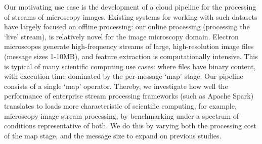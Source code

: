 \documentclass[conference]{IEEEtran}
\begin{document}


Our motivating use case 
is the development of a cloud pipeline for the processing of streams of microscopy images. Existing systems for working with such datasets have largely focused on offline processing: our online processing (processing the `live' stream), 
is relatively novel for the image microscopy domain. %
Electron microscopes generate high-frequency streams of large, high-resolution image files (message sizes 1-10MB), and feature extraction is computationally intensive. This is typical of many scientific computing use cases: where files have binary content, 
with execution time dominated by the per-message `map' stage. Our pipeline consists of a single `map' operator. 
Thereby, we investigate how well the performance of enterprise stream processing frameworks (such as Apache Spark) translates to loads more characteristic of scientific computing, for example, microscopy image stream processing, by benchmarking under a spectrum of conditions representative of both. We do this by varying both the processing cost of the map stage, and the message size to expand on previous studies.

\end{document}
